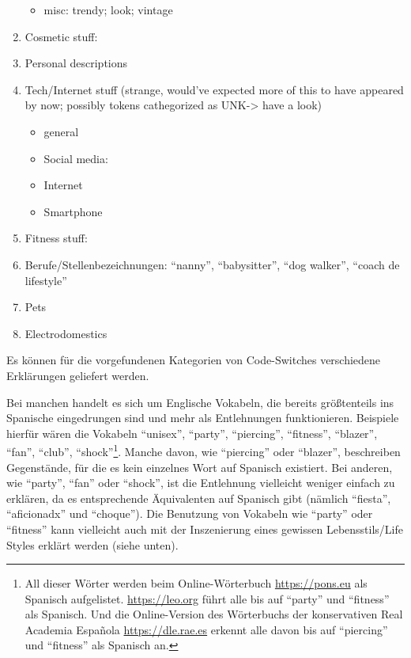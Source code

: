\begin{enumerate}
\begin{itemize}
      \item misc: trendy; look; vintage
    \end{itemize}
  \item Cosmetic stuff:
  \item Personal descriptions
  \item Tech/Internet stuff (strange, would've expected more of this to have appeared by now; possibly tokens cathegorized as UNK-> have a look)
    \begin{itemize}
      \item general
      \item Social media:
      \item Internet
      \item Smartphone
    \end{itemize}
  \item Fitness stuff:
  \item Berufe/Stellenbezeichnungen: ``nanny'', ``babysitter'', ``dog walker'', ``coach de lifestyle''
  \item Pets
  \item Electrodomestics
\end{enumerate}

Es können für die vorgefundenen Kategorien von Code-Switches verschiedene Erklärungen geliefert werden.

Bei manchen handelt es sich um Englische Vokabeln, die bereits größtenteils ins Spanische eingedrungen sind und mehr als Entlehnungen funktionieren.
Beispiele hierfür wären die Vokabeln ``unisex'', ``party'', ``piercing'', ``fitness'', ``blazer'', ``fan'', ``club'', ``shock''\footnote{All dieser Wörter werden beim Online-Wörterbuch \url{https://pons.eu} als Spanisch aufgelistet. \url{https://leo.org} führt alle bis auf ``party'' und ``fitness'' als Spanisch. Und die Online-Version des Wörterbuchs der konservativen Real Academia Española \url{https://dle.rae.es} erkennt alle davon bis auf ``piercing'' und ``fitness'' als Spanisch an.}.
Manche davon, wie ``piercing'' oder ``blazer'', beschreiben Gegenstände, für die es kein einzelnes Wort auf Spanisch existiert.
Bei anderen, wie ``party'', ``fan'' oder ``shock'',  ist die Entlehnung vielleicht weniger einfach zu erklären, da es entsprechende Äquivalenten auf Spanisch gibt (nämlich ``fiesta'', ``aficionadx'' und ``choque''). %
Die Benutzung von Vokabeln wie ``party'' oder ``fitness'' kann vielleicht auch mit der Inszenierung eines gewissen Lebensstils/Life Styles erklärt werden (siehe unten).

